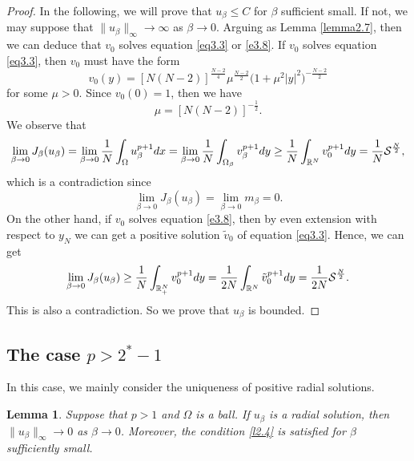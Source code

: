 \documentclass[12pt,reqno]{amsart}
\numberwithin{equation}{section}
\newtheorem{lemma}[theorem]{Lemma}
\theoremstyle{definition}
\def\R{{\Bbb R}}
\begin{document}
\begin{proof}
In the following, we will prove that $u_\beta\le C$ for $\beta$ sufficient small. If not, we may suppose that $\|u_\beta\|_\infty\to \infty$ as $\beta\to 0$. Arguing as Lemma \ref{lemma2.7}, then we can deduce that $v_0$ solves equation \eqref{eq3.3} or \eqref{e3.8}. 
If $v_0$ solves equation \eqref{eq3.3}, then $v_0$ must have the form 
$$
v_0(y)=[N(N-2)]^{\frac{N-2}{4}}\mu^{\frac{N-2}{2}}\Big(1+\mu^2|y|^2\Big)^{-\frac{N-2}{2}}
$$
for some $\mu>0$. Since $v_0(0)=1$, then we have 
$$
\mu=[N(N-2)]^{-\frac{1}{2}}. 
$$
We observe that 
$$
\lim_{\beta\to0}J_\beta(u_\beta)=\lim_{\beta\to0}\frac{1}{N}\int_{\Omega}u_\beta^{p+1}dx=\lim_{\beta\to0}\frac{1}{N}\int_{\Omega_\beta}v_\beta^{p+1}dy\ge \frac{1}{N}\int_{\R^N}v_0^{p+1}dy=\frac{1}{N}\mathcal{S}^{\frac{N}{2}},
$$
which is a contradiction since 
$$
\lim_{\beta\to0}J_\beta(u_\beta)=\lim_{\beta\to 0}m_\beta=0.
$$
On the other hand, if $v_0$ solves equation \eqref{e3.8}, then by even extension with respect to $y_N$ we can 
get a positive solution $\tilde{v}_0$ of equation \eqref{eq3.3}. Hence, we can get 
\begin{equation*}
\lim_{\beta\to0}J_\beta(u_\beta)\ge \frac{1}{N}\int_{\R_+^N}v_0^{p+1}dy=\frac{1}{2N}\int_{\R^N}\tilde{v}_0^{p+1}dy=\frac{1}{2N}\mathcal{S}^{\frac{N}{2}}.
\end{equation*}
This is also a contradiction. So we prove that $u_\beta$ is bounded.
\end{proof}

\subsection{The case $p>2^*-1$} In this case, we mainly consider the uniqueness of positive radial solutions.


\begin{lemma}\label{lemma2.6}
Suppose that $p>1$ and $\Omega$ is a ball. If $u_\beta$ is a radial solution, then 
$\|u_\beta\|_{\infty}\to 0$  as $\beta\to 0$. Moreover, the condition \eqref{l2.4} is satisfied for $\beta$ sufficiently small.
\end{lemma}
\end{document}
